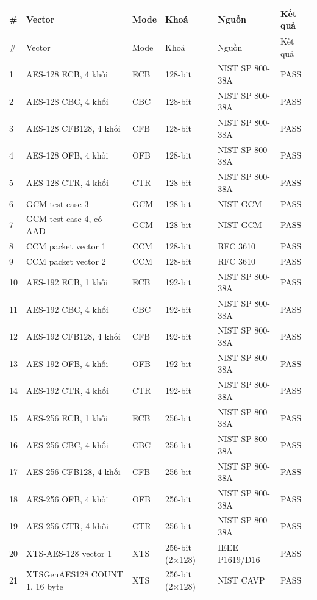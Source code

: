 \documentclass[12pt,a4paper,oneside]{report}
\begin{document}
\begin{longtable}{p{}p{}p{}p{}p{}p{}}
\toprule
\# & Vector & Mode & Khoá & Nguồn & Kết quả \\
\midrule
\endfirsthead
\toprule
\# & Vector & Mode & Khoá & Nguồn & Kết quả \\
\midrule
\endhead
1 & AES-128 ECB, 4 khối & ECB & 128-bit & NIST SP 800-38A & PASS \\
2 & AES-128 CBC, 4 khối & CBC & 128-bit & NIST SP 800-38A & PASS \\
3 & AES-128 CFB128, 4 khối & CFB & 128-bit & NIST SP 800-38A & PASS \\
4 & AES-128 OFB, 4 khối & OFB & 128-bit & NIST SP 800-38A & PASS \\
5 & AES-128 CTR, 4 khối & CTR & 128-bit & NIST SP 800-38A & PASS \\
6 & GCM test case 3 & GCM & 128-bit & NIST GCM & PASS \\
7 & GCM test case 4, có AAD & GCM & 128-bit & NIST GCM & PASS \\
8 & CCM packet vector 1 & CCM & 128-bit & RFC 3610 & PASS \\
9 & CCM packet vector 2 & CCM & 128-bit & RFC 3610 & PASS \\
10 & AES-192 ECB, 1 khối & ECB & 192-bit & NIST SP 800-38A & PASS \\
11 & AES-192 CBC, 4 khối & CBC & 192-bit & NIST SP 800-38A & PASS \\
12 & AES-192 CFB128, 4 khối & CFB & 192-bit & NIST SP 800-38A & PASS \\
13 & AES-192 OFB, 4 khối & OFB & 192-bit & NIST SP 800-38A & PASS \\
14 & AES-192 CTR, 4 khối & CTR & 192-bit & NIST SP 800-38A & PASS \\
15 & AES-256 ECB, 1 khối & ECB & 256-bit & NIST SP 800-38A & PASS \\
16 & AES-256 CBC, 4 khối & CBC & 256-bit & NIST SP 800-38A & PASS \\
17 & AES-256 CFB128, 4 khối & CFB & 256-bit & NIST SP 800-38A & PASS \\
18 & AES-256 OFB, 4 khối & OFB & 256-bit & NIST SP 800-38A & PASS \\
19 & AES-256 CTR, 4 khối & CTR & 256-bit & NIST SP 800-38A & PASS \\
20 & XTS-AES-128 vector 1 & XTS & 256-bit (2×128) & IEEE P1619/D16 & PASS \\
21 & XTSGenAES128 COUNT 1, 16 byte & XTS & 256-bit (2×128) & NIST CAVP & PASS \\

\end{longtable}
\end{document}
